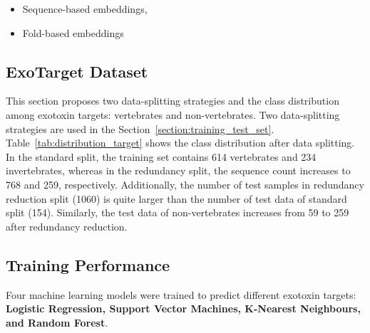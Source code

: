 \begin{itemize}
	\item Sequence-based embeddings,
	\item Fold-based embeddings 
\end{itemize}



\subsection{ExoTarget Dataset}

This section proposes two data-splitting strategies and the class distribution among exotoxin targets: vertebrates and non-vertebrates. Two data-splitting strategies are used in the Section~\ref{section:training_test_set}. Table~\ref{tab:distribution_target} shows the class distribution after data splitting. 
In the standard split, the training set contains 614 vertebrates and 234 invertebrates, whereas in the redundancy split, the sequence count increases to 768 and 259, respectively. Additionally, the number of test samples in redundancy reduction split (1060) is quite larger than the number of test data of standard split (154). Similarly, the test data of non-vertebrates increases from 59 to 259 after redundancy reduction.

\begin{table}[h]
	\centering
		\caption{Class distribution before and after redundancy reduction using two different splitting approaches. Redundancy Reduction Split and Standard Split}
	\label{tab:distribution_target}
\end{table}


\subsection{Training Performance}
Four machine learning models were trained to predict different exotoxin targets: \textbf{Logistic Regression, Support Vector Machines, K-Nearest Neighbours, and Random Forest}.


